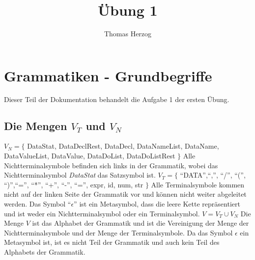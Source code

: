 \documentclass[11pt, a4paper, twoside]{article}   	%
\title{Übung 1}
\author{Thomas Herzog}
\begin{document}
\setlength{\headheight}{15mm}


\section {Grammatiken - Grundbegriffe}
\label{sec:grammar-basics}
Dieser Teil der Dokumentation behandelt die Aufgabe 1 der ersten Übung.
\subsection{Die Mengen $V_{T}$ und $V_{N}$}
$V_{N}=\{$ DataStat, DataDeclRest, DataDecl, DataNameList, DataName, DataValueList, DataValue, DataDoList, DataDoListRest $\}$
\newline
\newline
Alle Nichtterminalsymbole befinden sich links in der Grammatik, wobei das Nichtterminalsymbol \emph{DataStat} das Satzsymbol ist.
\newline
\newline
\newline
$V_{T}=\{$ \enquote{DATA},\enquote{,}, \enquote{/}, \enquote{(}, \enquote{)},\enquote{=}, \enquote{*}, \enquote{+}, \enquote{-}, \enquote{=}, expr, id, num, str $\}$
\newline
\newline
Alle Terminalsymbole kommen nicht auf der linken Seite der Grammatik vor und können nicht weiter abgeleitet werden. Das Symbol \enquote{$\epsilon$} ist ein Metasymbol, dass die leere Kette repräsentiert und ist weder ein Nichtterminalsymbol oder ein Terminalsymbol.
\newline
\newline
\newline
$V=V_{T} \cup V_{N}$
\newline
\newline
Die Menge $V$ ist das Alphabet der Grammatik und ist die Vereinigung der Menge der Nichtterminalsymbole und der Menge der Terminalsymbole. Da das Symbol $\epsilon$ ein Metasymbol ist, ist es nicht Teil der Grammatik und auch kein Teil des Alphabets der Grammatik.
\end{document}
